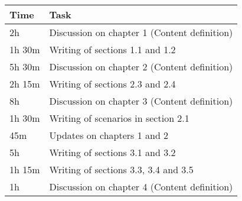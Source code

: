 \begin{center}
    {\renewcommand{\arraystretch}{2}%
    \begin{tabular}{L{2cm}L{12cm}}
        \hline
        \textbf{Time} & \textbf{Task} \\
        \hline
        2h & Discussion on chapter 1 (Content definition) \\
        \hline
        1h 30m & Writing of sections 1.1 and 1.2 \\
        \hline
        5h 30m & Discussion on chapter 2 (Content definition) \\
        \hline
        2h 15m & Writing of sections 2.3 and 2.4 \\
        \hline
        8h & Discussion on chapter 3 (Content definition) \\
        \hline
        1h 30m & Writing of scenarios in section 2.1 \\
        \hline
        45m & Updates on chapters 1 and 2 \\
        \hline
        5h & Writing of sections 3.1 and 3.2 \\
        \hline
        1h 15m & Writing of sections 3.3, 3.4 and 3.5 \\
        \hline
        1h & Discussion on chapter 4 (Content definition) \\
        \hline
    \end{tabular}}
\end{center}